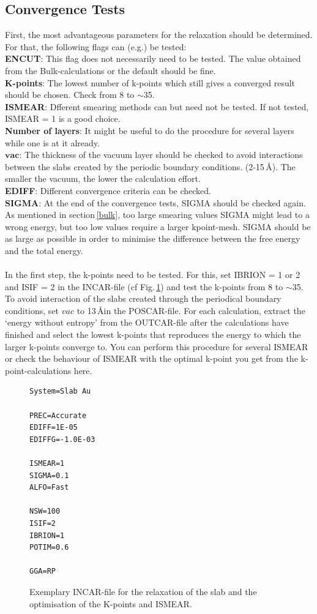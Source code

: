 \documentclass[11pt,oneside,a4paper, captions=nooneline, headsepline]{article}%
\begin{document}
\subsection{Convergence Tests}
First, the most advantageous parameters for the relaxation should be determined. For that, the following flags can (e.g.) be tested:\\
\textbf{ENCUT}: This flag does not necessarily need to be tested. The value obtained from the Bulk-calculations or the default should be fine.\\
\textbf{K-points}: The lowest number of k-points which still gives a converged result should be chosen. Check from 8 to $\sim$35.\\
\textbf{ISMEAR}: Dfferent smearing methods can but need not be tested. If not tested, ISMEAR = 1 is a good choice.\\
\textbf{Number of layers}: It might be useful to do the procedure for several layers while one is at it already.\\
$\textbf{vac}$: The thickness of the vacuum layer should be checked to avoid interactions between the slabs created by the periodic boundary conditions. (2-15\,\AA). The smaller the vacuum, the lower the calculation effort.\\
\textbf{EDIFF}: Different convergence criteria can be checked.\\
\textbf{SIGMA}: At the end of the convergence tests, SIGMA should be checked again. As mentioned in section\,\ref{bulk}, too large smearing values SIGMA might lead to a wrong energy, but too low values require a larger kpoint-mesh. SIGMA should be as large as possible in order to minimise the difference between the free energy and the total energy.\\
\\
In the first step, the k-points need to be tested. For this, set IBRION = 1 or 2 and ISIF = 2 in the INCAR-file (cf Fig.\,\ref{slabincar1}) and test the k-points from 8 to $\sim$35. To avoid interaction of the slabs created through the periodical boundary conditions, set $vac$ to 13\,\AA in the POSCAR-file.
For each calculation, extract the `energy without entropy' from the OUTCAR-file after the calculations have finished and select the lowest k-points that reproduces the energy to which the larger k-points converge to. You can perform this procedure for several ISMEAR or check the behaviour of ISMEAR with the optimal k-point you get from the k-point-calculations here.
\begin{figure}[h!!]
\begin{verbatim}
System=Slab Au

PREC=Accurate
EDIFF=1E-05
EDIFFG=-1.0E-03

ISMEAR=1
SIGMA=0.1
ALFO=Fast

NSW=100
ISIF=2
IBRION=1
POTIM=0.6

GGA=RP
\end{verbatim}
\caption{Exemplary INCAR-file for the relaxation of the slab and the optimisation of the K-points and ISMEAR.}
\label{slabincar1}
\end{figure}
\end{document}
